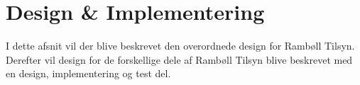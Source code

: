 \chapter{Design \& Implementering}
I dette afsnit vil der blive beskrevet den overordnede design for Rambøll Tilsyn. Derefter vil design for de forskellige dele af Rambøll Tilsyn blive beskrevet med en design, implementering og test del. \\


